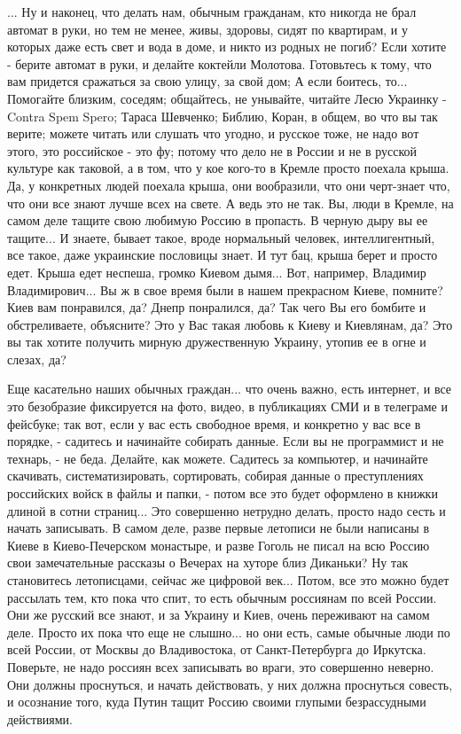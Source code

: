 ... Ну и наконец, что делать нам, обычным гражданам, кто никогда не брал
автомат в руки, но тем не менее, живы, здоровы, сидят по квартирам, и у которых
даже есть свет и вода в доме, и никто из родных не погиб? Если хотите - берите
автомат в руки, и делайте коктейли Молотова.  Готовьтесь к тому, что вам
придется сражаться за свою улицу, за свой дом; А если боитесь, то... Помогайте
близким, соседям; общайтесь, не унывайте, читайте Лесю Украинку - Contra Spem
Spero; Тараса Шевченко; Библию, Коран, в общем, во что вы так верите; можете
читать или слушать что угодно, и русское тоже, не надо вот этого, это российское - это фу;
потому что дело не в России и не в русской культуре как таковой, а в том, что у
кое кого-то в Кремле просто поехала крыша. Да, у конкретных людей поехала
крыша, они вообразили, что они черт-знает что, что они все знают лучше всех на
свете.  А ведь это не так. Вы, люди в Кремле, на самом деле тащите свою любимую
Россию в пропасть. В черную дыру вы ее тащите... И знаете, бывает такое, вроде
нормальный человек, интеллигентный, все такое, даже украинские пословицы знает.
И тут бац, крыша берет и просто едет. Крыша едет неспеша, громко Киевом дымя...
Вот, например, Владимир Владимирович... Вы ж в свое время были в нашем
прекрасном Киеве, помните? Киев вам понравился, да? Днепр понралился, да? Так
чего Вы его бомбите и обстреливаете, объясните? Это у Вас такая любовь к Киеву
и Киевлянам, да? Это вы так хотите получить мирную дружественную Украину,
утопив ее в огне и слезах, да?

Еще касательно наших обычных граждан... что очень важно, есть интернет, и все
это безобразие фиксируется на фото, видео, в публикациях СМИ и в телеграме и
фейсбуке; так вот, если у вас есть свободное время, и конкретно у вас все в
порядке, - садитесь и начинайте собирать данные. Если вы не программист и не
технарь, - не беда.  Делайте, как можете. Садитесь за компьютер, и начинайте
скачивать, систематизировать, сортировать, собирая данные о преступлениях
российских войск в файлы и папки, - потом все это будет оформлено в книжки
длиной в сотни страниц...  Это совершенно нетрудно делать, просто надо сесть и
начать записывать. В самом деле, разве первые летописи не были написаны в Киеве
в Киево-Печерском монастыре, и разве Гоголь не писал на всю Россию свои
замечательные рассказы о Вечерах на хуторе близ Диканьки?  Ну так становитесь
летописцами, сейчас же цифровой век...  Потом, все это можно будет рассылать
тем, кто пока что спит, то есть обычным россиянам по всей России. Они же
русский все знают, и за Украину и Киев, очень переживают на самом деле. Просто
их пока что еще не слышно... но они есть, самые обычные люди по всей России, от
Москвы до Владивостока, от Санкт-Петербурга до Иркутска. Поверьте, не надо
россиян всех записывать во враги, это совершенно неверно. Они должны
проснуться, и начать действовать, у них должна проснуться совесть, и осознание
того, куда Путин тащит Россию своими глупыми безрассудными действиями. 

